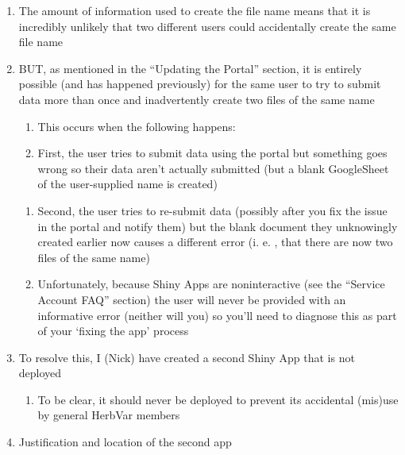 \documentclass[
  letterpaper,
  DIV=11,
  numbers=noendperiod]{scrreprt}
\providecommand{\tightlist}{%
  \setlength{\itemsep}{0pt}\setlength{\parskip}{0pt}}\usepackage{longtable,booktabs,array}
\begin{document}
\begin{enumerate}
\def\labelenumi{\arabic{enumi}.}
\item
  The amount of information used to create the file name means that it
  is incredibly unlikely that two different users could accidentally
  create the same file name
\item
  BUT, as mentioned in the ``Updating the Portal'' section, it is
  entirely possible (and has happened previously) for the same user to
  try to submit data more than once and inadvertently create two files
  of the same name

  \begin{enumerate}
  \def\labelenumii{\alph{enumii}.}
  \item
    This occurs when the following happens:
  \item
    First, the user tries to submit data using the portal but something
    goes wrong so their data aren't actually submitted (but a blank
    GoogleSheet of the user-supplied name is created)
  \end{enumerate}

  \begin{enumerate}
  \def\labelenumii{\roman{enumii}.}
  \setcounter{enumii}{1}
  \item
    Second, the user tries to re-submit data (possibly after you fix the
    issue in the portal and notify them) but the blank document they
    unknowingly created earlier now causes a different error (i. e. ,
    that there are now two files of the same name)
  \item
    Unfortunately, because Shiny Apps are noninteractive (see the
    ``Service Account FAQ'' section) the user will never be provided
    with an informative error (neither will you) so you'll need to
    diagnose this as part of your `fixing the app' process
  \end{enumerate}
\item
  To resolve this, I (Nick) have created a second Shiny App that is not
  deployed

  \begin{enumerate}
  \def\labelenumii{\alph{enumii}.}
  \tightlist
  \item
    To be clear, it should never be deployed to prevent its accidental
    (mis)use by general HerbVar members
  \end{enumerate}
\item
  Justification and location of the second app


\end{enumerate}
\end{document}
